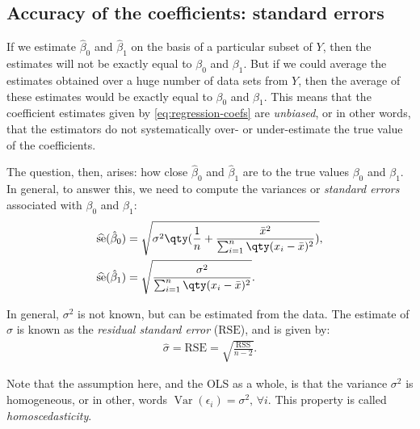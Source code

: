 \subsection{Accuracy of the coefficients: standard errors}
If we estimate $\hat{\beta}_{0}$ and $\hat{\beta}_{1}$ on the basis of a particular subset of $Y$, then the estimates will not be exactly equal to $\beta_{0}$ and $\beta_{1}$. But if we could average the estimates obtained over a huge number of data sets from $Y$, then the average of these estimates would be exactly equal to $\beta_{0}$ and $\beta_{1}$. This means that the coefficient estimates given by \eqref{eq:regression-coefs} are \emph{unbiased}, or in other words, that the estimators do not systematically over- or under-estimate the true value of the coefficients.

The question, then, arises: how close $\hat{\beta}_{0}$ and $\hat{\beta}_{1}$ are to the true values $\beta_{0}$ and $\beta_{1}$. In general, to answer this, we need to compute the variances or \emph{standard errors} associated with $\beta_{0}$ and $\beta_{1}$:
\begin{subequations}
\begin{align}
	\se{\hat{\beta}_{0}} &= \sqrt{ \sigma^{2} \qty(\frac{1}{n} + \frac{ \bar{x}^{2} }{ \sum_{i=1}^{n} \qty(x_{i} - \bar{x})^{2} } ) }
	,
	\\
	\se{\hat{\beta}_{1}}  &= \sqrt{ \frac{ \sigma^{2} }{ \sum_{i=1}^{n} \qty(x_{i} - \bar{x})^{2} } }
	.
\end{align}
\end{subequations}

In general, $\sigma^{2}$ is not known, but can be estimated from the data. The estimate
of $\sigma$ is known as the \emph{residual standard error} ($\text{RSE}$), and is given by:
\begin{align}
	\hat{\sigma} = \text{RSE} = \sqrt{\frac{\text{RSS}}{n - 2}}.
\end{align}

Note that the assumption here, and the OLS as a whole, is that the variance $\sigma^{2}$ is homogeneous, or in other, words $\operatorname{Var}(\epsilon_{i}) = \sigma^{2},\, \forall i$. This property is called \emph{homoscedasticity}.

